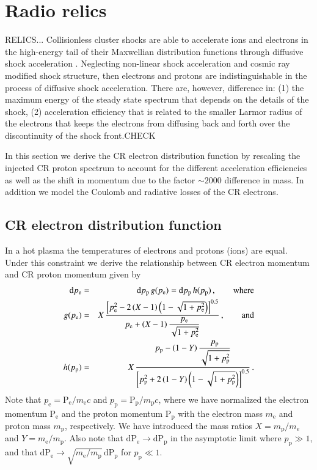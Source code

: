 \documentclass[useAMS,usenatbib]{mn2e}
\newcommand{\dd}{\mathrm{d}}
\newcommand{\p}{\mathrm{p}}
\newcommand{\Pp}{\mathrm{P}_\mathrm{p}}
\newcommand{\Pe}{\mathrm{P}_\mathrm{e}}
\newcommand{\pp}{p_\mathrm{p}}
\newcommand{\pe}{p_\mathrm{e}}
\newcommand{\e}{\mathrm{e}}
\begin{document}
\section{Radio relics}
\label{section:relics}
RELICS...  Collisionless cluster shocks are able to accelerate ions
and electrons in the high-energy tail of their Maxwellian distribution
functions through diffusive shock acceleration \citep[for reviews
  see][]{1983RPPh...46..973D, 1987PhR...154....1B,
  2001RPPh...64..429M}. Neglecting non-linear shock acceleration and
cosmic ray modified shock structure, then electrons and protons are
indistinguishable in the process of diffusive shock
acceleration. There are, however, difference in: (1) the maximum
energy of the steady state spectrum that depends on the details of the
shock, (2) acceleration efficiency that is related to the smaller
Larmor radius of the electrons that keeps the electrons from diffusing
back and forth over the discontinuity of the shock front.CHECK

In this section we derive the CR electron distribution function by
rescaling the injected CR proton spectrum to account for the different
acceleration efficiencies as well as the shift in momentum due to the
factor $\sim 2000$ difference in mass. In addition we model the
Coulomb and radiative losses of the CR electrons.

\subsection{CR electron distribution function} 
In a hot plasma the temperatures of electrons and protons (ions) are
equal. Under this constraint we derive the relationship between CR
electron momentum and CR proton momentum given by
\begin{eqnarray}
  \label{eq:pe_pp}
\dd \pe &=& \dd \pp \,g(\pe) =  \dd \pp \,h(\pp)\,,\qquad \rmn{where}\\
g(\pe) &=& X \,\frac{\left[\pe^2-2\left(X-1\right)\left(1-\sqrt{1+\pe^2}\right)\right]^{0.5}}{\displaystyle\pe+\left(X-1\right)\frac{\pe}{\sqrt{1+\pe^2}}}\,,\qquad \rmn{and}\\
h(\pp) &=& X \,\frac{\displaystyle\pp-\left(1-Y\right)\frac{\pp}{\sqrt{1+\pp^2}}}{\left[\pp^2+2\left(1-Y\right)\left(1-\sqrt{1+\pp^2}\right)\right]^{0.5}}\,.\\
\end{eqnarray}
Note that $\pe = \Pe/m_\e c$ and $\pp = \Pp/m_\p c$, where we have
normalized the electron momentum $\Pe$ and the proton momentum $\Pp$
with the electron mass $m_\e$ and proton mass $m_\p$, respectively. We
have introduced the mass ratios $X=m_\p/m_\e$ and $Y=m_\e/m_\p$. Also
note that $\dd \Pe\rightarrow \dd \Pp$ in the asymptotic limit where
$\pp\gg 1$, and that $\dd \Pe\rightarrow \sqrt{m_\e / m_\p}\,\dd \Pp$ for
$\pp\ll 1$. 
\end{document}
